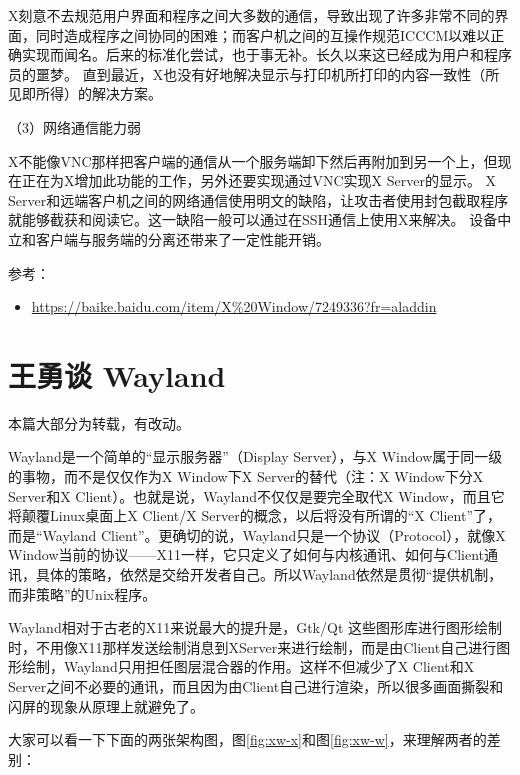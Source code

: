\documentclass[doctor,openright,twoside]{sjtuthesis}
\providecommand{\tightlist}{%
    \setlength{\itemsep}{0pt}\setlength{\parskip}{0pt}}
\theoremstyle{plain}
\theoremstyle{definition}
\theoremstyle{remark}
\theoremstyle{ocrenumbox}
\theoremstyle{plain}
\newcommand\cqh{“}
\newcommand\cqt{”}
\begin{document}
X刻意不去规范用户界面和程序之间大多数的通信，导致出现了许多非常不同的界面，同时造成程序之间协同的困难；而客户机之间的互操作规范ICCCM以难以正确实现而闻名。后来的标准化尝试，也于事无补。长久以来这已经成为用户和程序员的噩梦。
直到最近，X也没有好地解决显示与打印机所打印的内容一致性（所见即所得）的解决方案。

（3）网络通信能力弱

X不能像VNC那样把客户端的通信从一个服务端卸下然后再附加到另一个上，但现在正在为X增加此功能的工作，另外还要实现通过VNC实现X
Server的显示。 X
Server和远端客户机之间的网络通信使用明文的缺陷，让攻击者使用封包截取程序就能够截获和阅读它。这一缺陷一般可以通过在SSH通信上使用X来解决。
设备中立和客户端与服务端的分离还带来了一定性能开销。

参考：

\begin{itemize}
\tightlist
\item
  \url{https://baike.baidu.com/item/X\%20Window/7249336?fr=aladdin}
\end{itemize}

\hypertarget{-wayland}{%
\section{王勇谈 Wayland}\label{-wayland}}

本篇大部分为转载，有改动。

Wayland是一个简单的\cqh 显示服务器\cqt （Display Server），与X
Window属于同一级的事物，而不是仅仅作为X Window下X Server的替代（注：X
Window下分X Server和X Client）。也就是说，Wayland不仅仅是要完全取代X
Window，而且它将颠覆Linux桌面上X Client/X
Server的概念，以后将没有所谓的\cqh X Client\cqt 了，而是\cqh Wayland
Client\cqt 。更确切的说，Wayland只是一个协议（Protocol），就像X
Window当前的协议------X11一样，它只定义了如何与内核通讯、如何与Client通讯，具体的策略，依然是交给开发者自己。所以Wayland依然是贯彻\cqh 提供机制，而非策略\cqt 的Unix程序。

Wayland相对于古老的X11来说最大的提升是，Gtk/Qt
这些图形库进行图形绘制时，不用像X11那样发送绘制消息到XServer来进行绘制，而是由Client自己进行图形绘制，Wayland只用担任图层混合器的作用。这样不但减少了X
Client和X
Server之间不必要的通讯，而且因为由Client自己进行渲染，所以很多画面撕裂和闪屏的现象从原理上就避免了。

大家可以看一下下面的两张架构图，图\ref{fig:xw-x}和图\ref{fig:xw-w}，来理解两者的差别：
\end{document}
